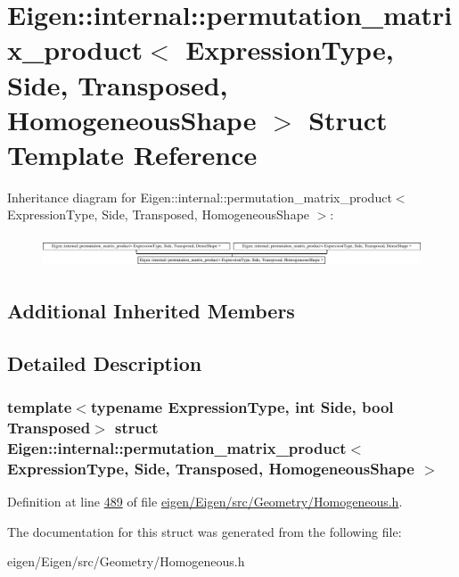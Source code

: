 \hypertarget{struct_eigen_1_1internal_1_1permutation__matrix__product_3_01_expression_type_00_01_side_00_01_t6e72df7be1755279b5abe7eabbb39875}{}\section{Eigen\+:\+:internal\+:\+:permutation\+\_\+matrix\+\_\+product$<$ Expression\+Type, Side, Transposed, Homogeneous\+Shape $>$ Struct Template Reference}
\label{struct_eigen_1_1internal_1_1permutation__matrix__product_3_01_expression_type_00_01_side_00_01_t6e72df7be1755279b5abe7eabbb39875}
Inheritance diagram for Eigen\+:\+:internal\+:\+:permutation\+\_\+matrix\+\_\+product$<$ Expression\+Type, Side, Transposed, Homogeneous\+Shape $>$\+:\begin{figure}[H]
\begin{center}
\leavevmode
\includegraphics[height=0.919540cm]{struct_eigen_1_1internal_1_1permutation__matrix__product_3_01_expression_type_00_01_side_00_01_t6e72df7be1755279b5abe7eabbb39875}
\end{center}
\end{figure}
\subsection*{Additional Inherited Members}


\subsection{Detailed Description}
\subsubsection*{template$<$typename Expression\+Type, int Side, bool Transposed$>$\newline
struct Eigen\+::internal\+::permutation\+\_\+matrix\+\_\+product$<$ Expression\+Type, Side, Transposed, Homogeneous\+Shape $>$}



Definition at line \hyperlink{eigen_2_eigen_2src_2_geometry_2_homogeneous_8h_source_l00489}{489} of file \hyperlink{eigen_2_eigen_2src_2_geometry_2_homogeneous_8h_source}{eigen/\+Eigen/src/\+Geometry/\+Homogeneous.\+h}.



The documentation for this struct was generated from the following file\+:\begin{DoxyCompactItemize}
\item 
eigen/\+Eigen/src/\+Geometry/\+Homogeneous.\+h\end{DoxyCompactItemize}
